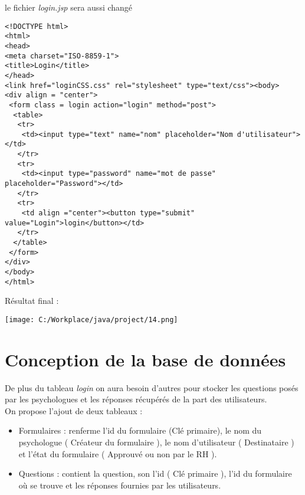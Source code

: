 \documentclass[12]{article}
\begin{document}
le fichier \textit{login.jsp} sera aussi changé 


\lstset{language=XML}
\begin{small}
\begin{lstlisting}
<!DOCTYPE html>
<html>
<head>
<meta charset="ISO-8859-1">
<title>Login</title>
</head>
<link href="loginCSS.css" rel="stylesheet" type="text/css"><body>
<div align = "center">
 <form class = login action="login" method="post">
  <table>
   <tr>
    <td><input type="text" name="nom" placeholder="Nom d'utilisateur"></td>
   </tr>
   <tr>
    <td><input type="password" name="mot de passe" placeholder="Password"></td>
   </tr>
   <tr>
    <td align ="center"><button type="submit" value="Login">login</button></td>
   </tr>
  </table>
 </form>
</div>
</body>
</html>
\end{lstlisting}
\end{small}


Résultat final :

\begin{center}
\hspace*{-2cm}\texttt{[image: C:/Workplace/java/project/14.png]}
\end{center}














\section{Conception de la base de données}

De plus du tableau \textit{login} on aura besoin d'autres pour stocker les questions posés par les psychologues et les réponses récupérés de la part des utilisateurs.\\
On propose l'ajout de deux tableaux :\\
\begin{itemize}
\item Formulaires : renferme l'id du formulaire (Clé primaire), le nom du psychologue ( Créateur du formulaire ), le nom d'utilisateur ( Destinataire ) et l'état du formulaire ( Approuvé ou non par le RH ).\\
\item Questions : contient la question, son l'id ( Clé primaire ), l'id du formulaire où se trouve et les réponses fournies par les utilisateurs.
\end{itemize}
\end{document}
